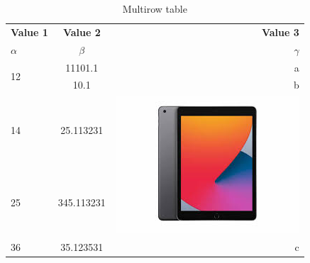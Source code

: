 \documentclass{article}
\begin{document}
	\begin{table}[h!]
		\begin{center}
			\caption{Multirow table}
			\label{tab:table1}
			\begin{tabular}{l|c|r}
				\hline\textbf{Value 1} & \textbf{Value 2} & \textbf{Value 3}\\ $\alpha$ & $\beta$ & $\gamma$ \\
				\hline
				\multirow{2}{*}{12} & 11101.1 & a \\
				 & 10.1 & b \\
				\hline
				14 & 25.113231 &
				\multirow{2}{*}{\includegraphics[width=0.07\linewidth]{image}} \\
				25 & 345.113231 & \\
				\hline
				36 & 35.123531 & c\\
				\hline
			\end{tabular}
		\end{center}
	\end{table}
\end{document}
